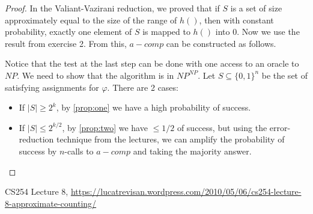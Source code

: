 \documentclass[12pt, a4paper]{article} %
\theoremstyle{definition}
\begin{document}
\begin{proof}
  In the Valiant-Vazirani reduction, we proved that if $S$ is a set of size approximately equal to the size of the range of $h()$, then with constant probability, exactly one element of $S$ is mapped to $h()$ into 0. Now we use the result from exercise 2. From this, $a-comp$ can be constructed as follows.

  \begin{algorithm}[H]
    \SetAlgoNoLine
    \caption{$a-comp$}
    \label{2-approx}
  \end{algorithm}

  Notice that the test at the last step can be done with one access to an oracle to $NP$. We need to show that the algorithm is in $NP^{NP}$. Let $S \subseteq \{0,1\}^n$ be the set of satisfying assignments for $\varphi$. There are 2 cases:

  \begin{itemize}
    \item If $|S| \geq 2^{k}$, by \ref{prop:one} we have a high probability of success.
    \item If $|S| \leq 2^{k/2}$, by \ref{prop:two} we have $\leq 1/2$ of success, but using the error-reduction technique from the lectures, we can amplify the probability of success by $n$-calls to $a-comp$ and taking the majority answer.
  \end{itemize}


\end{proof}

\begin{thebibliography}{1}
   CS254 Lecture 8, \url{https://lucatrevisan.wordpress.com/2010/05/06/cs254-lecture-8-approximate-counting/}
\end{thebibliography}
\end{document}
